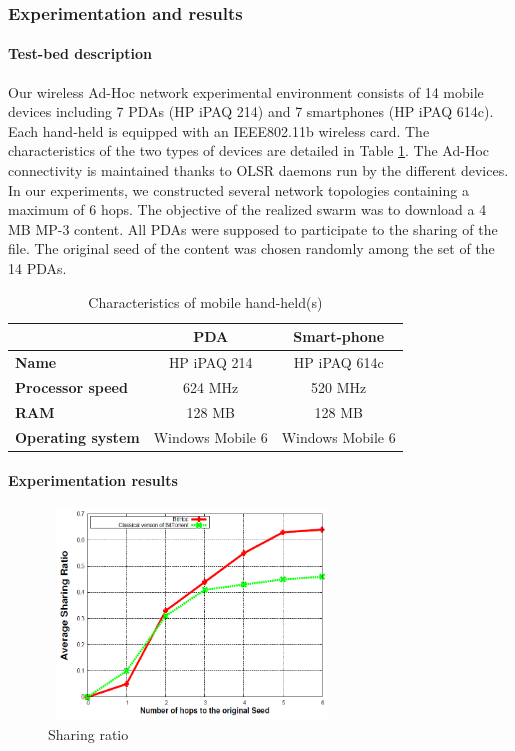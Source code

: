 \subsubsection{Experimentation and results}
\label{sectest}

\paragraph{Test-bed description}

Our wireless Ad-Hoc network experimental environment consists of 14 mobile devices including 7 PDAs (HP iPAQ 214) and 7 smartphones (HP iPAQ 614c). Each hand-held is equipped with an IEEE802.11b wireless card. The characteristics of the two types of devices are detailed in Table \ref{tabcarac}. The Ad-Hoc connectivity is maintained thanks to OLSR daemons run by the different devices. In our experiments, we constructed several network topologies containing a maximum of 6 hops. The objective of the realized swarm was to download a 4 MB MP-3 content. All PDAs were supposed to participate to the sharing of the file. The original seed of the content was chosen randomly among the set of the 14 PDAs.

\begin{table}[!h]
\center
\label{tabcarac}
\caption{Characteristics of mobile hand-held(s)}
\begin{tabular}{|l|c|c|}
  \hline
   & \textbf{PDA} & \textbf{Smart-phone} \\
  \hline
  \textbf{Name} & HP iPAQ 214 & HP iPAQ 614c\\
\hline
  \textbf{Processor speed} & 624 MHz & 520 MHz \\
  \hline
\textbf{RAM} & 128 MB & 128 MB \\
  \hline
\textbf{Operating system} & Windows Mobile 6 & Windows Mobile 6 \\
  \hline
\end{tabular}
\end{table}

\paragraph{Experimentation results}

\begin{figure}[!h]
  \begin{center}
    \includegraphics[width=3in,height=2.2in]{Chapitre2/sharingratio.png}
  \end{center}
  \caption{Sharing ratio}
  \label{figsharing}
\end{figure}

